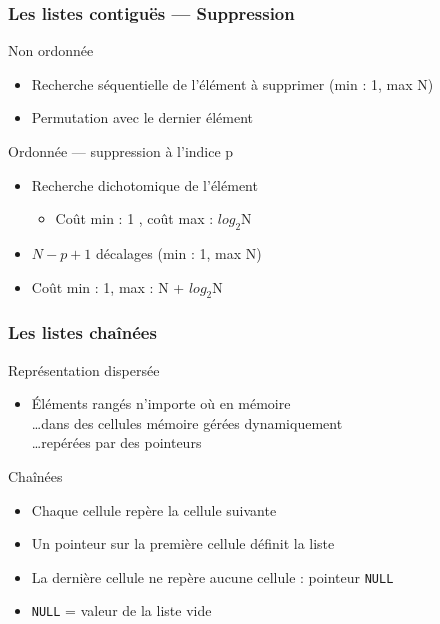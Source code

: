 \documentclass[table,handout,tikz,12pt,svgnames]{beamer}
\begin{document}
\begin{frame}[fragile=singleslide]
	\frametitle{Les listes contiguës --- Suppression}
	\begin{block}{Non ordonnée}
		\begin{itemize}
			\item Recherche séquentielle de l'élément à supprimer (min : 1, max N)
			\item Permutation avec le dernier élément
		\end{itemize}
	\end{block}
	\begin{block}{Ordonnée --- suppression à l'indice p}
		\begin{itemize}
			\item Recherche dichotomique de l'élément
			\begin{itemize}
				\item Coût min : 1 , coût max : $log_2$N
			\end{itemize}
			\item $N-p+1$ décalages (min : 1, max N)
			\item Coût min : 1, max : N + $log_2$N
		\end{itemize}
	\end{block}
\end{frame}


\begin{frame}[fragile=singleslide]
	\frametitle{Les listes chaînées}
	\begin{block}{Représentation dispersée}
		\begin{itemize}
			\item Éléments rangés n'importe où en mémoire\\
			\ldots dans des cellules mémoire gérées dynamiquement\\
			\ldots repérées par des pointeurs
		\end{itemize}
	\end{block}
	\begin{block}{Chaînées}
		\begin{itemize}
			\item Chaque cellule repère la cellule suivante
			\item Un pointeur sur la première cellule définit la liste
			\item La dernière cellule ne repère aucune cellule : pointeur \texttt{NULL}
			\item \texttt{NULL} = valeur de la liste vide
		\end{itemize}
	\end{block}
\end{frame}
\end{document}
